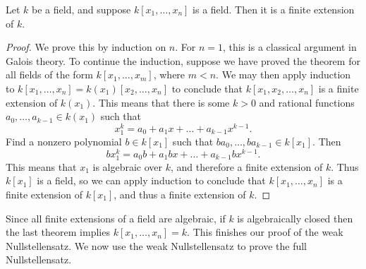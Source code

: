 \begin{lemma}
    Let $k$ be a field, and suppose $k[x_1, \dots, x_n]$ is a field. Then it is a finite extension of $k$.
\end{lemma}
\begin{proof}
    We prove this by induction on $n$. For $n = 1$, this is a classical argument in Galois theory. To continue the induction, suppose we have proved the theorem for all fields of the form $k[x_1, \dots, x_m]$, where $m < n$. We may then apply induction to $k[x_1, \dots, x_n] = k(x_1)[x_2, \dots, x_n]$ to conclude that $k[x_1, x_2, \dots, x_n]$ is a finite extension of $k(x_1)$. This means that there is some $k > 0$ and rational functions $a_0,\dots,a_{k-1} \in k(x_1)$ such that
    \[ x_1^k = a_0 + a_1 x + \dots + a_{k-1} x^{k-1}. \]
    Find a nonzero polynomial $b \in k[x_1]$ such that $ba_0,\dots,ba_{k-1} \in k[x_1]$. Then
    \[ b x_1^k = a_0 b + a_1 b x + \dots + a_{k-1} b x^{k-1}. \]
    This means that $x_1$ is algebraic over $k$, and therefore a finite extension of $k$. Thus $k[x_1]$ is a field, so we can apply induction to conclude that $k[x_1,\dots,x_n]$ is a finite extension of $k[x_1]$, and thus a finite extension of $k$.
\end{proof}

Since all finite extensions of a field are algebraic, if $k$ is algebraically closed then the last theorem implies $k[x_1,\dots,x_n] = k$. This finishes our proof of the weak Nullstellensatz. We now use the weak Nullstellensatz to prove the full Nullstellensatz.

